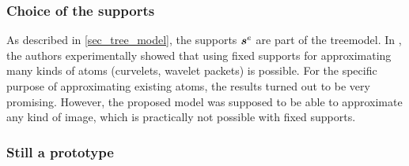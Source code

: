 \subsubsection{Choice of the supports}

As described in \cref{sec_tree_model}, the supports $\bm{s}^e$ are part of the \gls{treemodel}. In \cite{chabiron_toward_2015}, the authors experimentally showed that using fixed supports for approximating many kinds of atoms (curvelets, wavelet packets) is possible. For the specific purpose of approximating existing atoms, the results turned out to be very promising. However, the proposed model was supposed to be able to approximate any kind of image, which is practically not possible with fixed supports.

\subsubsection{Still a prototype}

